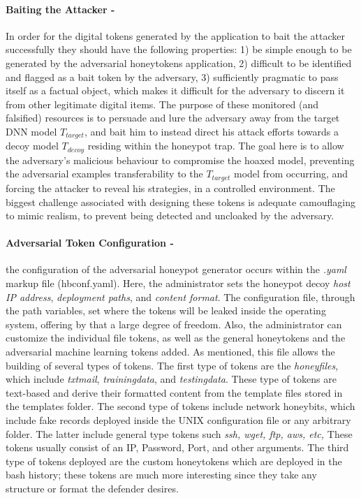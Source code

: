 \documentclass[grad,lot,lof,11pt,oneside,onehalfspace]{RUthesis}
\begin{document}
\paragraph{Baiting the Attacker -} In order for the digital tokens generated by the application to bait the attacker successfully they should have the following properties: 1) be simple enough to be generated by the adversarial honeytokens application, 2) difficult to be identified and flagged as a bait token by the adversary, 3) sufficiently pragmatic to pass itself as a factual object, which makes it difficult for the adversary to discern it from other legitimate digital items. The purpose of these monitored (and falsified) resources is to persuade and lure the adversary away from the target DNN model \textit{$T_{target}$}, and bait him to instead direct his attack efforts towards a decoy model \textit{$T_{decoy}$} residing within the honeypot trap. The goal here is to allow the adversary's malicious behaviour to compromise the hoaxed model, preventing the adversarial examples transferability to the \textit{$T_{target}$} model from occurring, and forcing the attacker to reveal his strategies, in a controlled environment. The biggest challenge associated with designing these tokens is adequate camouflaging to mimic realism, to prevent being detected and uncloaked by the adversary.
\paragraph{Adversarial Token Configuration -} the configuration of the adversarial honeypot generator occurs within the \textit{.yaml} markup file (hbconf.yaml). Here, the administrator sets the honeypot decoy \textit{host IP address}, \textit{deployment paths}, and \textit{content format}. The configuration file, through the path variables, set where the tokens will be leaked inside the operating system, offering by that a large degree of freedom.  Also, the administrator can customize the individual file tokens, as well as the general honeytokens and the adversarial machine learning tokens added. As mentioned, this file allows the building of several types of tokens. The first type of tokens are the \textit{honeyfiles}, which include \textit{txtmail}, \textit{trainingdata}, and \textit{testingdata}. These type of tokens are text-based and derive their formatted content from the template files stored in the templates folder. The second type of tokens include network honeybits, which include fake records deployed inside the UNIX configuration file or any arbitrary folder. The latter include general type tokens such \textit{ssh, wget, ftp, aws, etc,} These tokens usually consist of an IP, Password, Port, and other arguments. The third type of tokens deployed are the custom honeytokens which are deployed in the bash history; these tokens are much more interesting since they take any structure or format the defender desires.  
\end{document}
